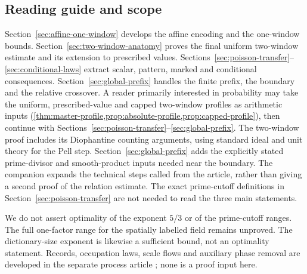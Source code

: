 \subsection{Reading guide and scope}
Section~\ref{sec:affine-one-window} develops the affine encoding and the
one-window bounds. Section~\ref{sec:two-window-anatomy} proves the final
uniform two-window estimate and its extension to prescribed values.
Sections~\ref{sec:poisson-transfer}--\ref{sec:conditional-laws} extract scalar,
pattern, marked and conditional consequences. Section~\ref{sec:global-prefix}
handles the finite prefix, the boundary and the relative crossover.
A reader primarily interested in probability may take the uniform,
prescribed-value and capped two-window profiles as arithmetic inputs
(\cref{thm:master-profile,prop:absolute-profile,prop:capped-profile}), then
continue with Sections~\ref{sec:poisson-transfer}--\ref{sec:global-prefix}.
The two-window proof includes its Diophantine counting arguments, using
standard ideal and unit theory for the Pell step. Section~\ref{sec:global-prefix}
adds the explicitly stated prime-divisor and smooth-product inputs needed
near the boundary. The companion expands the technical steps called from
the article, rather than giving a second proof of the relation estimate.
The exact prime-cutoff definitions in Section~\ref{sec:poisson-transfer}
are not needed to read the three main statements.

We do not assert optimality of the exponent $5/3$ or of the prime-cutoff
ranges. The full one-factor range for the spatially labelled field remains
unproved. The dictionary-size exponent is likewise a sufficient bound,
not an optimality statement. Records, occupation laws, scale flows and
auxiliary phase removal are developed in the separate process article
\cite{PoulyLatticePoissonFlows2026}; none is a proof input here.
